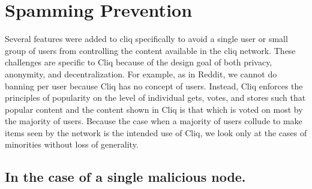 \documentclass{sig-alternate}
\begin{document}
\section{Spamming Prevention}
\label{sec:spam}

Several features were added to cliq specifically to avoid a single user or small group of users from controlling the content available in the cliq network.
These challenges are specific to Cliq because of the design goal of both privacy, anonymity, and decentralization. 
For example, as in Reddit, we cannot do banning per user because Cliq has no concept of users. 
Instead, Cliq enforces the principles of popularity on the level of individual gets, votes, and stores such that popular content and the content shown in Cliq is that which is voted on most by the majority of users. 
Because the case when a majority of users collude to make items seen by the network is the intended use of Cliq, we look only at the cases of minorities without loss of generality. 

\subsection{In the case of a single malicious node.}
\label{subsec:spamsingle}
\end{document}
